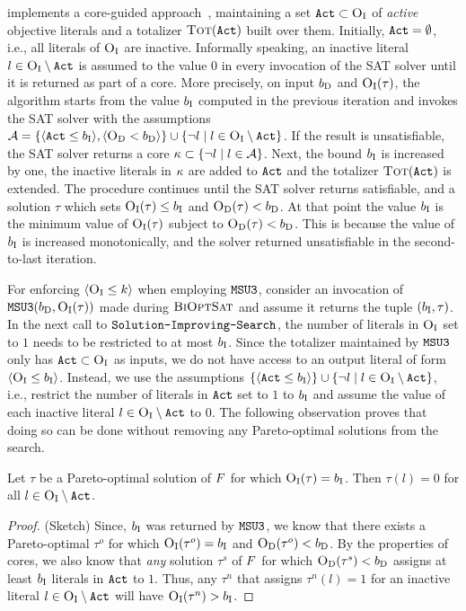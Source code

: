 \msu{} implements a core-guided approach~\autocites{DBLP:journals/corr/abs-0712-1097,DBLP:conf/sat/AnsoteguiBL09}, maintaining a set $\texttt{Act} \subset \textsc{O}_{\text{I}}$ of \emph{active} objective literals and a totalizer $\textsc{Tot}(\texttt{Act})$ built over them. 
Initially, $\texttt{Act} = \emptyset$, i.e., all literals of $\textsc{O}_{\text{I}}$ are inactive.
Informally speaking, an inactive literal $l \in \textsc{O}_{\text{I}} \setminus \texttt{Act}$ is assumed to the value $0$ in every invocation of the SAT solver until it is returned as part of a core.
More precisely, on input $b_{\text{D}}$ and $\textsc{O}_{\text{I}}(\tau)$, the algorithm starts from the value $b_{\text{I}}$ computed in the previous iteration and invokes the SAT solver with the assumptions $\mathcal{A} = \{\langle \texttt{Act} \leq b_{\text{I}} \rangle, \langle \textsc{O}_{\text{D}} < b_{\text{D}} \rangle  \} \cup \{ \lnot l \mid l \in \textsc{O}_{\text{I}} \setminus \texttt{Act}\}$.
If the result is unsatisfiable, the SAT solver returns a core $\kappa \subset \{\lnot l \mid l \in \mathcal{A}\}$.
Next, the bound $b_{\text{I}}$ is increased by one, the inactive literals in $\kappa$ are added to $\texttt{Act}$ and the totalizer $\textsc{Tot}(\texttt{Act})$ is extended.
The procedure continues until the SAT solver returns satisfiable, and a solution $\tau$ which sets $\textsc{O}_{\text{I}}(\tau) \leq b_{\text{I}}$ and $\textsc{O}_{\text{D}}(\tau) < b_{\text{D}}$.
At that point the value $b_{\text{I}}$ is the minimum value of $\textsc{O}_{\text{I}}(\tau)$ subject to $\textsc{O}_{\text{D}}(\tau) < b_{\text{D}}$.
This is because the value of $b_{\text{I}}$ is increased monotonically, and the solver returned unsatisfiable in the second-to-last iteration. 

For enforcing $\langle \textsc{O}_{\text{I}} \leq k \rangle$ when employing $\texttt{MSU3}$, consider an invocation of $\texttt{MSU3}(b_{\text{D}} , \textsc{O}_{\text{I}}(\tau))$ made during $\textsc{BiOptSat}$ and assume it returns the tuple $(b_{\text{I}}, \tau)$. 
In the next call to $\texttt{Solution-\allowbreak{}Improving-\allowbreak{}Search}$, the number of literals in $\textsc{O}_{\text{I}}$ set to $1$ needs to be restricted to at most $b_{\text{I}}$. 
Since the totalizer maintained by $\texttt{MSU3}$ only has $\texttt{Act} \subset \textsc{O}_{\text{I}}$ as inputs, we do not have access to an output literal of form  $\langle \textsc{O}_{\text{I}} \leq b_{\text{I}} \rangle$.
Instead, we use  the assumptions $\{\langle \texttt{Act} \leq b_{\text{I}} \rangle\} \cup \{ \lnot l \mid l \in \textsc{O}_{\text{I}} \setminus \texttt{Act} \}$, i.e., restrict the number of literals in $\texttt{Act}$ set to $1$ to $b_{\text{I}}$ and assume the value of each inactive literal $l \in \textsc{O}_{\text{I}} \setminus \texttt{Act}$ to $0$. 
The following observation proves that doing so can be done without removing any Pareto-optimal solutions from the search. 
\begin{observation}\label{obs:sound}
  Let $\tau$ be a Pareto-optimal solution of $F$ for which $\textsc{O}_{\text{I}}(\tau) = b_{\text{I}}$.
  Then $\tau(l) = 0$ for all $l \in \textsc{O}_{\text{I}} \setminus \texttt{Act}$. 
\end{observation}
\begin{proof}(Sketch)
  Since, $b_{\text{I}}$ was returned by $\texttt{MSU3}$, we know that there exists a Pareto-optimal $\tau^o$ for which $\textsc{O}_{\text{I}}(\tau^o) = b_{\text{I}}$ and $\textsc{O}_{\text{D}}(\tau^o) < b_{\text{D}}$.
  By the properties of cores, we also know that \emph{any} solution $\tau^s$ of $F$ for which $\textsc{O}_{\text{D}}(\tau^s) < b_{\text{D}}$ assigns at least $b_{\text{I}}$ literals in $\texttt{Act}$ to $1$.
  Thus, any $\tau^n$ that assigns $\tau^n(l) = 1$ for an inactive literal $l \in  \textsc{O}_{\text{I}} \setminus \texttt{Act}$ will have $\textsc{O}_{\text{I}}(\tau^n) > b_{\text{I}}$.
\end{proof}

